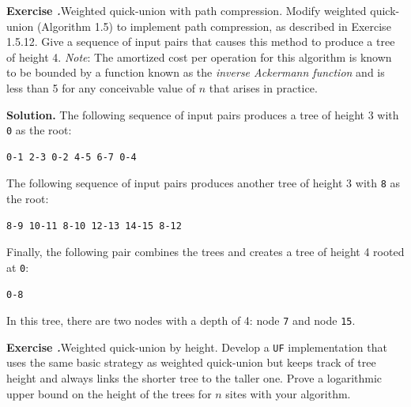 \documentclass[12pt, a4paper]{article}
\newenvironment{ex}[2][Exercise]
{\par\medskip\noindent \textbf{#1 #2.}}
{\medskip}
\newenvironment{sol}[1][Solution]
{\par\medskip\noindent \textbf{#1.} }
{\medskip}
\begin{document}
	\begin{ex}{13}
		\emph{Weighted quick-union with path compression}. Modify weighted quick-union (Algorithm 1.5)
		to implement path compression, as described in Exercise 1.5.12. Give a sequence of input
		pairs that causes this method to produce a tree of height 4.
		\emph{Note}: The amortized cost per operation for this algorithm is known to be bounded by
		a function known as the \emph{inverse Ackermann function} and is less than 5 for any conceivable
		value of $n$ that arises in practice.
	\end{ex}
	\begin{sol}
		The following sequence of input pairs produces a tree of height 3 with \texttt{0} as the root:
		\begin{lstlisting}[language={}]
0-1 2-3 0-2 4-5 6-7 0-4
		\end{lstlisting}
		The following sequence of input pairs produces another tree of height 3 with \texttt{8} as the root:
		\begin{lstlisting}[language={}]
8-9 10-11 8-10 12-13 14-15 8-12
		\end{lstlisting}
		Finally, the following pair combines the trees and creates a tree of height 4 rooted at \texttt{0}:
		\begin{lstlisting}[language={}]
0-8
		\end{lstlisting}	
		In this tree, there are two nodes with a depth of 4: node \texttt{7} and node \texttt{15}.
	\end{sol}
	\begin{ex}{14}
		\emph{Weighted quick-union by height}. Develop a \texttt{UF} implementation that uses the
		same basic strategy as weighted quick-union but keeps track of tree height and always
		links the shorter tree to the taller one. Prove a logarithmic upper bound on the height
		of the trees for $n$ sites with your algorithm.
	\end{ex}
\end{document}
